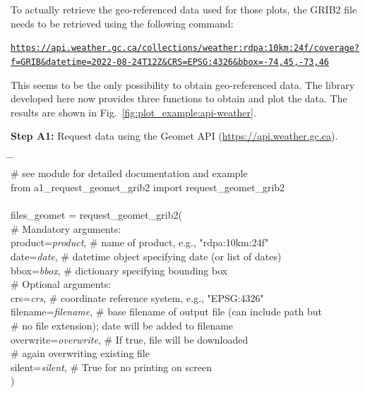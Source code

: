 \documentclass[10pt,a4paper,titlepage,parskip]{scrartcl}
\newenvironment{ttfont}{\fontfamily{\ttdefault}\selectfont}{\par}
\newcommand{\GRAU}[1]{\textcolor{ufzgray2}{#1}}
\begin{document}
To actually retrieve the geo-referenced data used for those plots, the GRIB2 file needs to be retrieved using the following command:
\begin{framed}
\texttt{\url{https://api.weather.gc.ca/collections/weather:rdpa:10km:24f/coverage?f=GRIB&datetime=2022-08-24T12Z&CRS=EPSG:4326&bbox=-74,45,-73,46}}
\end{framed}
This seems to be the only possibility to obtain geo-referenced data. The library developed here now provides three functions to obtain and plot the data. The results are shown in Fig.~\ref{fig:plot_example:api-weather}.

\textbf{Step A1:} Request data using the Geomet API (\url{https://api.weather.gc.ca}).
\begin{framed}
	\vspace*{-1.2cm}
	\begin{ttfont}
	\begin{tabbing}
		\hspace{1.0cm} \= \hspace{3.9cm} \= \kill \\[4pt]
		\GRAU{\# see module for detailed documentation and example}\\
		from a1\_request\_geomet\_grib2 import request\_geomet\_grib2\\
		\\
		files\_geomet = request\_geomet\_grib2(\\
		\> \GRAU{\# Mandatory arguments:}\\
		\> product=\textit{product}, \> \GRAU{\# name of product, e.g., "rdpa:10km:24f"}\\
		\> date=\textit{date},\> \GRAU{\# datetime object specifying date (or list of dates)}\\
		\> bbox=\textit{bbox},\> \GRAU{\# dictionary specifying bounding box}\\
		\> \GRAU{\# Optional arguments:}\\
		\> crs=\textit{crs},\> \GRAU{\# coordinate reference system, e.g., "EPSG:4326"}\\
		\> filename=\textit{filename},\> \GRAU{\# base filename of output file (can include path but }\\
		\>                           \> \GRAU{\# no file extension); date will be added to filename}\\
		\> overwrite=\textit{overwrite},\> \GRAU{\# If true, file will be downloaded }\\
		\>                           \> \GRAU{\# again overwriting existing file}\\
		\> silent=\textit{silent}, \> \GRAU{\# True for no printing on screen}\\
		\> ) \> 
	\end{tabbing}
	\end{ttfont}
	\vspace*{-0.3cm}
\end{framed}
\end{document}
